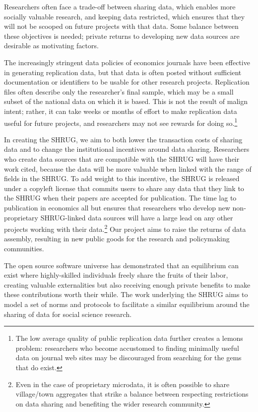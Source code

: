 \documentclass[12pt,letterpaper]{article}
\begin{document}
Researchers often face a trade-off between sharing data, which enables
more socially valuable research, and keeping data restricted, which
ensures that they will not be scooped on future projects with that
data. Some balance between these objectives is needed; private returns
to developing new data sources are desirable as motivating factors.

The increasingly stringent data policies of economics journals have
been effective in generating replication data, but that data is often
posted without sufficient documentation or identifiers to be usable
for other research projects. Replication files often describe only the
researcher's final sample, which may be a small subset of the national
data on which it is based. This is not the result of malign intent;
rather, it can take weeks or months of effort to make replication data
useful for future projects, and researchers may not see rewards for
doing so.\footnote{The low average quality of public replication data
  further creates a lemons problem: researchers who become accustomed
  to finding minimally useful data on journal web sites may be
  discouraged from searching for the gems that do exist.}

In creating the SHRUG, we aim to both lower the transaction costs of
sharing data and to change the institutional incentives around data
sharing. Researchers who create data sources that are compatible with
the SHRUG will have their work cited, because the data will be more
valuable when linked with the range of fields in the SHRUG. To add
weight to this incentive, the SHRUG is released under a copyleft
license that commits users to share any data that they link to the
SHRUG when their papers are accepted for publication.  The time lag to
publication in economics all but ensures that researchers who develop
new non-proprietary SHRUG-linked data sources will have a large lead
on any other projects working with their data.\footnote{Even in the
  case of proprietary microdata, it is often possible to share
  village/town aggregates that strike a balance between respecting
  restrictions on data sharing and benefiting the wider research
  community.} Our project aims to raise the returns of data assembly,
resulting in new public goods for the research and policymaking
communities.

The open source software universe has demonstrated that an equilibrium
can exist where highly-skilled individuals freely share the fruits of
their labor, creating valuable externalities but also receiving enough
private benefits to make these contributions worth their while. The
work underlying the SHRUG aims to model a set of norms and protocols
to facilitate a similar equilibrium around the sharing of data for
social science research.
\end{document}
